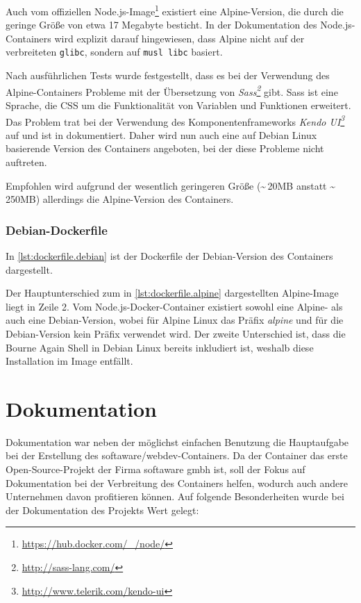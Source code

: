 Auch vom offiziellen Node.js-Image\footnote{\url{https://hub.docker.com/_/node/}} existiert eine Alpine-Version, die durch die geringe Größe von etwa 17 Megabyte besticht.
In der Dokumentation des Node.js-Containers wird explizit darauf hingewiesen, dass Alpine nicht auf der verbreiteten \verb|glibc|, sondern auf \verb|musl libc| basiert.

Nach ausführlichen Tests wurde festgestellt, dass es bei der Verwendung des Alpine-Containers Probleme mit der Übersetzung von \emph{Sass\footnote{\url{http://sass-lang.com/}}} gibt.
Sass ist eine Sprache, die CSS um die Funktionalität von Variablen und Funktionen erweitert.
Das Problem trat bei der Verwendung des Komponentenframeworks \emph{Kendo UI\footnote{\url{http://www.telerik.com/kendo-ui}}} auf und ist in \autocite{Simko.sass-segfault:online} dokumentiert.
Daher wird nun auch eine auf Debian Linux basierende Version des Containers angeboten, bei der diese Probleme nicht auftreten.

Empfohlen wird aufgrund der wesentlich geringeren Größe (\textasciitilde{}\,20MB anstatt \textasciitilde{}\,250MB) allerdings die Alpine-Version des Containers.

\subsubsection{Debian-Dockerfile}

In \cref{lst:dockerfile.debian} ist der Dockerfile der Debian-Version des Containers dargestellt.

Der Hauptunterschied zum in \cref{lst:dockerfile.alpine} dargestellten Alpine-Image liegt in Zeile 2.
Vom Node.js-Docker-Container existiert sowohl eine Alpine- als auch eine Debian-Version, wobei für Alpine Linux das Präfix \emph{alpine} und für die Debian-Version kein Präfix verwendet wird.
Der zweite Unterschied ist, dass die Bourne Again Shell in Debian Linux bereits inkludiert ist, weshalb diese Installation im Image entfällt.



\section{Dokumentation}
\label{sec:documentation}
Dokumentation war neben der möglichst einfachen Benutzung die Hauptaufgabe bei der Erstellung des softaware/webdev-Containers.
Da der Container das erste Open-Source-Projekt der Firma softaware gmbh ist, soll der Fokus auf Dokumentation bei der Verbreitung des Containers helfen, wodurch auch andere Unternehmen davon profitieren können.
Auf folgende Besonderheiten wurde bei der Dokumentation des Projekts Wert gelegt:


